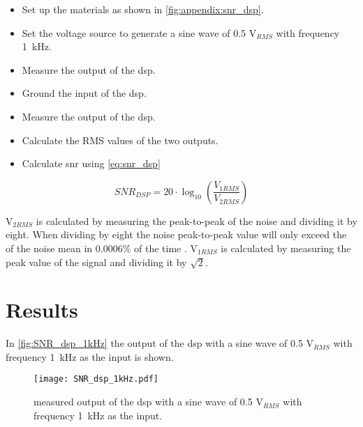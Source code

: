 \begin{itemize}
	\item Set up the materials as shown in \autoref{fig:appendix:snr_dsp}.
	\item Set the voltage source to generate a sine wave of 0.5 V$_{RMS}$ with frequency \SI{1}{\kilo\hertz}.
	\item Measure the output of the \gls{dsp}.
	\item Ground the input of the \gls{dsp}.
	\item Measure the output of the \gls{dsp}.
	\item Calculate the RMS values of the two outputs.
	\item Calculate \gls{snr} using \autoref{eq:snr_dsp}
\end{itemize}

\begin{equation}\label{eq:snr_dsp}
        SNR_{DSP} = 20 \cdot \log_{10}\left(\frac{V_{1RMS}}{V_{2RMS}}\right)
    \end{equation}
    
    \startexplain
    \stopexplain
    
V$_{2RMS}$ is calculated by measuring the peak-to-peak of the noise and dividing it by eight. When dividing by eight the noise peak-to-peak value will only exceed the  of the noise mean in 0.0006\% of the time \citep{rms_noise}.
V$_{1RMS}$ is calculated by measuring the peak value of the signal and dividing it by $\sqrt{2}$. 

\section{Results}
In \autoref{fig:SNR_dsp_1kHz} the output of the \gls{dsp} with a sine wave of 0.5 V$_{RMS}$ with frequency \SI{1}{\kilo\hertz} as the input is shown. 

\begin{figure}[!h]
  \centering
  \texttt{[image: SNR\_dsp\_1kHz.pdf]}
  \caption{measured output of the \gls{dsp} with a sine wave of 0.5 V$_{RMS}$ with frequency \SI{1}{\kilo\hertz} as the input.}
  \label{fig:SNR_dsp_1kHz}
\end{figure}

